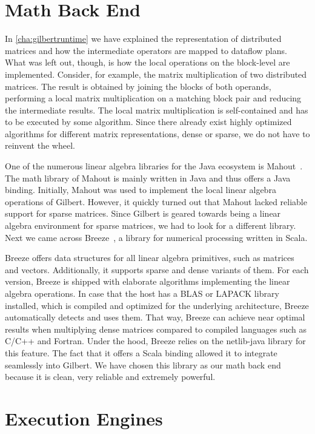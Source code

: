 \section{Math Back End}

In \cref{cha:gilbertruntime} we have explained the representation of distributed matrices and how the intermediate operators are mapped to dataflow plans.
What was left out, though, is how the local operations on the block-level are implemented.
Consider, for example, the matrix multiplication of two distributed matrices.
The result is obtained by joining the blocks of both operands, performing a local matrix multiplication on a matching block pair and reducing the intermediate results.
The local matrix multiplication is self-contained and has to be executed by some algorithm.
Since there already exist highly optimized algorithms for different matrix representations, dense or sparse, we do not have to reinvent the wheel.

One of the numerous linear algebra libraries for the Java ecosystem is Mahout~\cite{mahout:2011a}.
The math library of Mahout is mainly written in Java and thus offers a Java binding.
Initially, Mahout was used to implement the local linear algebra operations of Gilbert.
However, it quickly turned out that Mahout lacked reliable support for sparse matrices.
Since Gilbert is geared towards being a linear algebra environment for sparse matrices, we had to look for a different library.
Next we came across Breeze~\cite{breeze}, a library for numerical processing written in Scala.

Breeze offers data structures for all linear algebra primitives, such as matrices and vectors.
Additionally, it supports sparse and dense variants of them.
For each version, Breeze is shipped with elaborate algorithms implementing the linear algebra operations.
In case that the host has a BLAS or LAPACK library installed, which is compiled and optimized for the underlying architecture, Breeze automatically detects and uses them.
That way, Breeze can achieve near optimal results when multiplying dense matrices compared to compiled languages such as C/C++ and Fortran.
Under the hood, Breeze relies on the netlib-java library for this feature.
The fact that it offers a Scala binding allowed it to integrate seamlessly into Gilbert.
We have chosen this library as our math back end because it is clean, very reliable and extremely powerful.

\section{Execution Engines}


